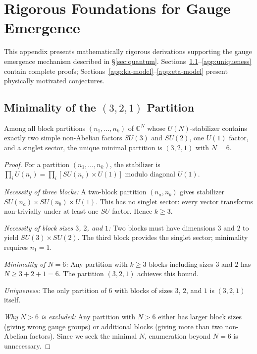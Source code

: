 
\section{Rigorous Foundations for Gauge Emergence}\label{app:gauge-emergence}

This appendix presents mathematically rigorous derivations supporting the gauge emergence mechanism described in \S\ref{sec:quantum}. Sections~\ref{app:partition}--\ref{app:uniqueness} contain complete proofs; Sections~\ref{app:ka-model}--\ref{app:eta-model} present physically motivated conjectures.

\subsection{Minimality of the $(3,2,1)$ Partition}\label{app:partition}

\begin{proposition}[Minimality]\label{prop:partition}
Among all block partitions $(n_1, \ldots, n_k)$ of $\mathbb{C}^N$ whose $U(N)$-stabilizer contains exactly two simple non-Abelian factors $SU(3)$ and $SU(2)$, one $U(1)$ factor, and a singlet sector, the unique minimal partition is $(3,2,1)$ with $N = 6$.
\end{proposition}

\begin{proof}
For a partition $(n_1, \ldots, n_k)$, the stabilizer is $\prod_i U(n_i) = \prod_i [SU(n_i) \times U(1)]$ modulo diagonal $U(1)$.

\textit{Necessity of three blocks:} A two-block partition $(n_a, n_b)$ gives stabilizer $SU(n_a) \times SU(n_b) \times U(1)$. This has no singlet sector: every vector transforms non-trivially under at least one $SU$ factor. Hence $k \geq 3$.

\textit{Necessity of block sizes $3$, $2$, and $1$:} Two blocks must have dimensions $3$ and $2$ to yield $SU(3) \times SU(2)$. The third block provides the singlet sector; minimality requires $n_1 = 1$.

\textit{Minimality of $N = 6$:} Any partition with $k \geq 3$ blocks including sizes $3$ and $2$ has $N \geq 3 + 2 + 1 = 6$. The partition $(3,2,1)$ achieves this bound.

\textit{Uniqueness:} The only partition of $6$ with blocks of sizes $3$, $2$, and $1$ is $(3,2,1)$ itself.

\textit{Why $N > 6$ is excluded:} Any partition with $N > 6$ either has larger block sizes (giving wrong gauge groups) or additional blocks (giving more than two non-Abelian factors). Since we seek the minimal $N$, enumeration beyond $N = 6$ is unnecessary.
\end{proof}

